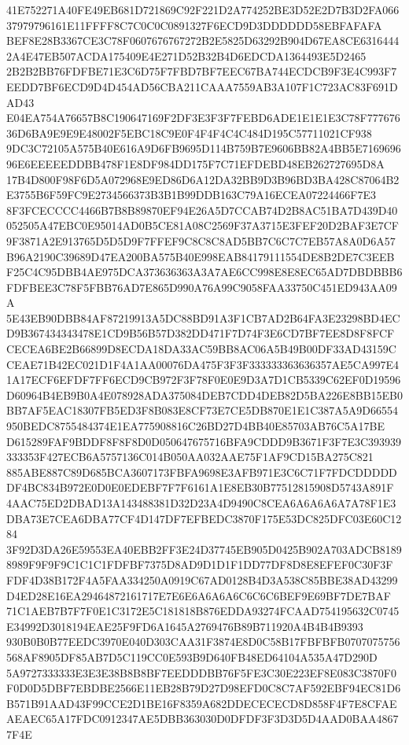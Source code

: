 \documentclass[UTF8,fontset=fandol,zihao=-4,a4paper]{ctexart}
\begin{document}
{{41E752271A40FE49EB681D721869C92F221D2A774252BE3D52E2D7B3D2FA06637979796161E11FFFF8C7C0C0C0891327F6ECD9D3DDDDDD58EBFAFAFA
BEF8E28B3367CE3C78F0607676767272B2E5825D63292B904D67EA8CE63164442A4E47EB507ACDA175409E4E271D52B32B4D6EDCDA1364493E5D2465
2B2B2BB76FDFBE71E3C6D75F7FBD7BF7EEC67BA744ECDCB9F3E4C993F7EEDD7BF6ECD9D4D454AD56CBA211CAAA7559AB3A107F1C723AC83F691DAD43
E04EA754A76657B8C190647169F2DF3E3F3F7FEBD6ADE1E1E1E3C78F77767636D6BA9E9E9E48002F5EBC18C9E0F4F4F4C4C484D195C57711021CF938
9DC3C72105A575B40E616A9D6FB9695D114B759B7E9606BB82A4BB5E716969696E6EEEEEDDBB478F1E8DF984DD175F7C71EFDEBD48EB262727695D8A
17B4D800F98F6D5A072968E9ED86D6A12DA32BB9D3B96BD3BA428C87064B2E3755B6F59FC9E2734566373B3B1B99DDB163C79A16ECEA07224466F7E3
8F3FCECCCC4466B7B8B89870EF94E26A5D7CCAB74D2B8AC51BA7D439D40052505A47EBC0E95014AD0B5CE81A08C2569F37A3715E3FEF20D2BAF3E7CF
9F3871A2E913765D5D5D9F7FFEF9C8C8C8AD5BB7C6C7C7EB57A8A0D6A57B96A2190C39689D47EA200BA575B40E998EAB84179111554DE8B2DE7C3EEB
F25C4C95DBB4AE975DCA373636363A3A7AE6CC998E8E8EC65AD7DBDBBB6FDFBEE3C78F5FBB76AD7E865D990A76A99C9058FAA33750C451ED943AA09A
5E43EB90DBB84AF87219913A5DC88BD91A3F1CB7AD2B64FA3E23298BD4ECD9B367434343478E1CD9B56B57D382DD471F7D74F3E6CD7BF7EE8D8F8FCF
CECEA6BE2B66899D8ECDA18DA33AC59BB8AC06A5B49B00DF33AD43159CCEAE71B42EC021D1F4A1AA00076DA475F3F3F333333363636357AE5CA997E4
1A17ECF6EFDF7FF6ECD9CB972F3F78F0E0E9D3A7D1CB5339C62EF0D19596D60964B4EB9B0A4E078928ADA375084DEB7CDD4DEB82D5BA226E8BB15EB0
BB7AF5EAC18307FB5ED3F8B083E8CF73E7CE5DB870E1E1C387A5A9D66554950BEDC8755484374E1EA775908816C26BD27D4BB40E85703AB76C5A17BE
D615289FAF9BDDF8F8F8D0D050647675716BFA9CDDD9B3671F3F7E3C393939333353F427ECB6A5757136C014B050AA032AAE75F1AF9CD15BA275C821
885ABE887C89D685BCA3607173FBFA9698E3AFB971E3C6C71F7FDCDDDDDDF4BC834B972E0D0E0EDEBF7F7F6161A1E8EB30B77512815908D5743A891F
4AAC75ED2DBAD13A143488381D32D23A4D9490C8CEA6A6A6A6A7A78F1E3DBA73E7CEA6DBA77CF4D147DF7EFBEDC3870F175E53DC825DFC03E60C1284
3F92D3DA26E59553EA40EBB2FF3E24D37745EB905D0425B902A703ADCB81898989F9F9F9C1C1C1FDFBF7375D8AD9D1D1F1DD77DF8D8E8EFEF0C30F3F
FDF4D38B172F4A5FAA334250A0919C67AD0128B4D3A538C85BBE38AD43299D4ED28E16EA29464872161717E7E6E6A6A6A6C6C6C6BEF9E69BF7DE7BAF
71C1AEB7B7F7F0E1C3172E5C181818B876EDDA93274FCAAD754195632C0745E34992D3018194EAE25F9FD6A1645A2769476B89B711920A4B4B4B9393
930B0B0B77EEDC3970E040D303CAA31F3874E8D0C58B17FBFBFB0707075756568AF8905DF85AB7D5C119CC0E593B9D640FB48ED64104A535A47D290D
5A9727333333E3E3E38B8B8BF7EEDDDBB76F5FE3C30E223EF8E083C3870F0F0D0D5DBF7EBDBE2566E11EB28B79D27D98EFD0C8C7AF592EBF94EC81D6
B571B91AAD43F99CCE2D1BE16F8359A682DDECECECD8D858F4F7E8CFAEAEAEC65A17FDC0912347AE5DBB363030D0DFDF3F3D3D5D4AAD0BAA48677F4E
}}
\end{document}
